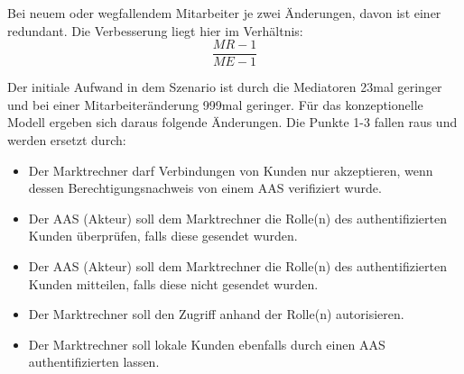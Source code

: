 \documentclass[11pt,a4paper]{report}
\begin{document}
Bei neuem oder wegfallendem Mitarbeiter je zwei Änderungen, davon ist einer redundant. Die Verbesserung liegt hier im Verhältnis:
\[
	\frac{MR-1}{ME-1}
\]

Der initiale Aufwand in dem Szenario ist durch die Mediatoren 23mal geringer und bei einer Mitarbeiteränderung 999mal geringer. Für das konzeptionelle Modell ergeben sich daraus folgende Änderungen. Die Punkte 1-3 fallen raus und werden ersetzt durch:

\begin{itemize}[leftmargin=*]
\item Der Marktrechner darf Verbindungen von Kunden nur akzeptieren, wenn dessen Berechtigungsnachweis von einem AAS verifiziert wurde.
\item Der AAS (Akteur) soll dem Marktrechner die Rolle(n) des authentifizierten Kunden überprüfen, falls diese gesendet wurden.
\item Der AAS (Akteur) soll dem Marktrechner die Rolle(n) des authentifizierten Kunden mitteilen, falls diese nicht gesendet wurden.
\item Der Marktrechner soll den Zugriff anhand der Rolle(n) autorisieren.
\item Der Marktrechner soll lokale Kunden ebenfalls durch einen AAS authentifizierten lassen.
\end{itemize}
\end{document}
